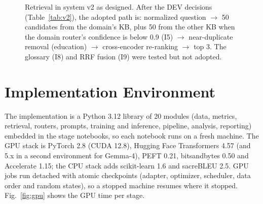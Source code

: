\begin{figure}[!t]
\centering
{}
\caption{Retrieval in system v2 as designed. After the DEV decisions (Table~\ref{tab:v2}), the adopted path is: normalized question $\rightarrow$ 50 candidates from the domain's KB, plus 50 from the other KB when the domain router's confidence is below 0.9 (I5) $\rightarrow$ near-duplicate removal (education) $\rightarrow$ cross-encoder re-ranking $\rightarrow$ top 3. The glossary (I8) and RRF fusion (I9) were tested but not adopted.}
\label{fig:v2}
\end{figure}

\section{Implementation Environment}
\label{sec:impl}
The implementation is a Python 3.12 library of 20 modules (data, metrics, retrieval, routers, prompts, training and inference, pipeline, analysis, reporting) embedded in the stage notebooks, so each notebook runs on a fresh machine. The GPU stack is PyTorch 2.8 (CUDA 12.8), Hugging Face Transformers 4.57 (and 5.x in a second environment for Gemma-4), PEFT 0.21, bitsandbytes 0.50 and Accelerate 1.15; the CPU stack adds scikit-learn 1.6 and sacreBLEU 2.5. GPU jobs run detached with atomic checkpoints (adapter, optimizer, scheduler, data order and random states), so a stopped machine resumes where it stopped. Fig.~\ref{fig:gpu} shows the GPU time per stage.

